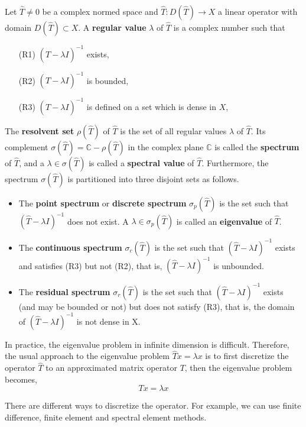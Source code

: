 \begin{definition}
	Let $\hat{T}\neq{0}$ be a complex normed space and $\hat{T}: D(\hat{T}) \to X$ a linear operator with domain $D(\hat{T})\subset X$. A \textbf{regular value} $\lambda$ of $\hat{T}$ is a complex number such that
	\begin{itemize}
		\item [(R1)] $(\hat{T}-\lambda I)^{-1}$ exists,
		\item [(R2)] $(\hat{T}-\lambda I)^{-1}$ is bounded,
		\item [(R3)] $(\hat{T}-\lambda I)^{-1}$ is defined on a set which is dense in $X$,
	\end{itemize}

	The \textbf{resolvent set} $\rho(\hat{T})$ of $\hat{T}$ is the set of all regular values $\lambda$ of $\hat{T}$. Its complement $\sigma(\hat{T}) = \mathbb{C} - \rho(\hat{T})$ in the complex plane $\mathbb{C}$ is called the \textbf{spectrum} of $\hat{T}$, and a $\lambda\in \sigma(\hat{T})$ is called a \textbf{spectral value} of $\hat{T}$. Furthermore, the spectrum $\sigma(\hat{T})$ is partitioned into three disjoint sets as follows.
	\begin{itemize}
		\item The \textbf{point spectrum} or \textbf{discrete spectrum} $\sigma_p(\hat{T})$ is the set such that $(\hat{T}-\lambda I)^{-1}$ does not exist. A $\lambda\in\sigma_p(\hat{T})$ is called an \textbf{eigenvalue} of $\hat{T}$.
		\item The \textbf{continuous spectrum} $\sigma_c(\hat{T})$ is the set such that $(\hat{T}-\lambda I)^{-1}$ exists and satisfies (R3) but not (R2), that is, $(\hat{T}-\lambda I)^{-1}$ is unbounded.
		\item The \textbf{residual spectrum} $\sigma_r(\hat{T})$ is the set such that $(\hat{T}-\lambda I)^{-1}$ exists (and may be bounded or not) but does not satisfy (R3), that is, the domain of $(\hat{T}-\lambda I)^{-1}$ is not dense in X.
	\end{itemize}
\end{definition}

In practice, the eigenvalue problem in infinite dimension is difficult.
Therefore, the usual approach to the eigenvalue problem $\hat{T}x=\lambda x$ is to first discretize the operator $\hat{T}$ to an approximated matrix operator $T$, then the eigenvalue problem becomes,
\[ Tx = \lambda x \]

There are different ways to discretize the operator. For example, we can use finite difference, finite element and spectral element methods.

